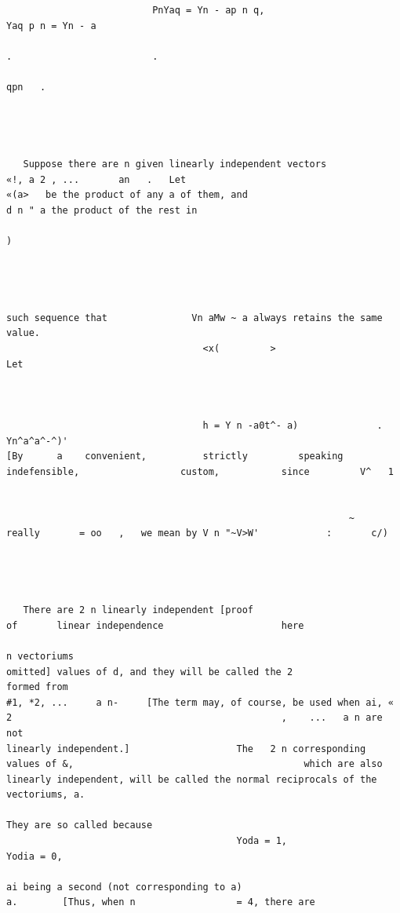 \documentclass[10pt]{article}
\begin{document}
\begin{verbatim}
                          PnYaq = Yn - ap n q,                         Yaq p n = Yn - a
                                                                              .                         .
                                                                                                            qpn   .




   Suppose there are n given linearly independent vectors                                                      «!, a 2 , ...       an   .   Let
«(a>   be the product of any a of them, and                                        d n " a the product of the rest in
                                                                                                )




such sequence that               Vn aMw ~ a always retains the same value.
                                   <x(         >                                                                           Let



                                   h = Y n -a0t^- a)              .    Yn^a^a^-^)'
[By      a    convenient,          strictly         speaking                 indefensible,                  custom,           since         V^   1


                                                             ~
really       = oo   ,   we mean by V n "~V>W'            :       c/)




   There are 2 n linearly independent [proof                                               of       linear independence                     here
                                                                                                    n vectoriums
omitted] values of d, and they will be called the 2                                                                         formed from
#1, *2, ...     a n-     [The term may, of course, be used when ai, « 2                                                ,    ...   a n are not
linearly independent.]                   The   2 n corresponding values of &,                                         which are also
linearly independent, will be called the normal reciprocals of the vectoriums, a.

They are so called because
                                         Yoda = 1,                       Yodia = 0,

ai being a second (not corresponding to a)                                        a.        [Thus, when n                  = 4, there are


\end{verbatim}
\end{document}
